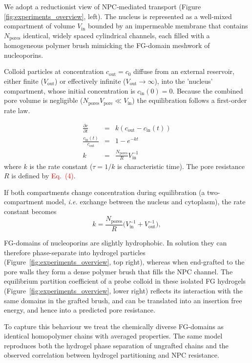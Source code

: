 \documentclass[10pt, a4paper, twocolumn]{article}
\newcommand\todo[1]{\textcolor{red}{#1}}
\begin{document}
We adopt a reductionist view of NPC‐mediated transport (Figure \ref{fig:experiments_overview}, left). 
The nucleus is represented as a well-mixed compartment of volume $V_{\text{in}}$ bounded by an impermeable membrane that contains $N_{\text{pores}}$ identical, widely spaced cylindrical channels, each filled with a homogeneous polymer brush mimicking the FG-domain meshwork of nucleoporins. 

Colloid particles at concentration $c_{\text{out}} = c_{0}$ diffuse from an external reservoir, either finite ($V_{\text{out}}$) or effectively infinite ($V_{\text{out}}\!\to\!\infty$), into the 'nucleus' compartment, whose initial concentration is $c_{\text{in}}(0)=0$.
Because the combined pore volume is negligible ($N_{\text{pores}}V_{\text{pore}}\ll V_{\text{in}}$) the equilibration follows a first-order rate law.

\begin{eqnarray}
    \frac{\partial c}{\partial t} &=& k (c_{\text{out}} - c_{\text{in}}(t)) \\
    \frac{c_{\text{in}}(t)}{c_{\text{out}}} &=& 1 - e^{-kt} \label{eq:kinetics} \\
    k &=& \frac{N_{\text{pores}}}{R} V_{\text{in}}^{-1}
    \label{eq:rate_constant}
\end{eqnarray}
where $k$ is the rate constant ($\tau = 1/k$ is characteristic time).
The pore resistance $R$ is defined by \todo{Eq.~(4)}.

If both compartments change concentration during equilibration
(a two-compartment model, \textit{i.e.} exchange between the nucleus and cytoplasm), the rate constant becomes
\begin{equation}
  k = \frac{N_{\text{pores}}}{R}
      \bigl(V_{\text{in}}^{-1}+V_{\text{out}}^{-1}\bigr),
  \label{eq:rate_constant_2}
\end{equation}

FG-domains of nucleoporins are slightly hydrophobic. 
In solution they can therefore phase-separate into hydrogel particles (Figure~\ref{fig:experiments_overview}, top right), whereas when end-grafted to the pore walls they form a dense polymer brush that fills the NPC channel.
The equilibrium partition coefficient of a probe colloid in these isolated FG hydrogels (Figure~\ref{fig:experiments_overview}, lower right) reflects its interaction with the same domains in the grafted brush, and can be translated into an insertion free energy, and hence into a predicted pore resistance.

To capture this behaviour we treat the chemically diverse FG-domains as identical homopolymer chains with averaged properties.  
The same model reproduces both the hydrogel phase separation of ungrafted chains and the observed correlation between hydrogel
partitioning and NPC resistance.
\end{document}
